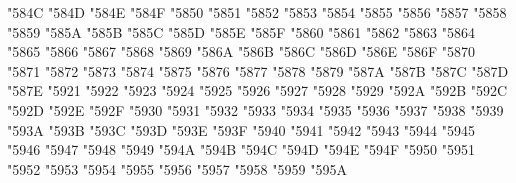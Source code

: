 {\Uchar\jis"584C %
\Uchar\jis"584D %
\Uchar\jis"584E %
\Uchar\jis"584F %
\Uchar\jis"5850 %
\Uchar\jis"5851 %
\Uchar\jis"5852 %
\Uchar\jis"5853 %
\Uchar\jis"5854 %
\Uchar\jis"5855 %
\Uchar\jis"5856 %
\Uchar\jis"5857 %
\Uchar\jis"5858 %
\Uchar\jis"5859 %
\Uchar\jis"585A %
\Uchar\jis"585B %
\Uchar\jis"585C %
\Uchar\jis"585D %
\Uchar\jis"585E %
\Uchar\jis"585F %
\Uchar\jis"5860 %
\Uchar\jis"5861 %
\Uchar\jis"5862 %
\Uchar\jis"5863 %
\Uchar\jis"5864 %
\Uchar\jis"5865 %
\Uchar\jis"5866 %
\Uchar\jis"5867 %
\Uchar\jis"5868 %
\Uchar\jis"5869 %
\Uchar\jis"586A %
\Uchar\jis"586B %
\Uchar\jis"586C %
\Uchar\jis"586D %
\Uchar\jis"586E %
\Uchar\jis"586F %
\Uchar\jis"5870 %
\Uchar\jis"5871 %
\Uchar\jis"5872 %
\Uchar\jis"5873 %
\Uchar\jis"5874 %
\Uchar\jis"5875 %
\Uchar\jis"5876 %
\Uchar\jis"5877 %
\Uchar\jis"5878 %
\Uchar\jis"5879 %
\Uchar\jis"587A %
\Uchar\jis"587B %
\Uchar\jis"587C %
\Uchar\jis"587D %
\Uchar\jis"587E %
\Uchar\jis"5921 %
\Uchar\jis"5922 %
\Uchar\jis"5923 %
\Uchar\jis"5924 %
\Uchar\jis"5925 %
\Uchar\jis"5926 %
\Uchar\jis"5927 %
\Uchar\jis"5928 %
\Uchar\jis"5929 %
\Uchar\jis"592A %
\Uchar\jis"592B %
\Uchar\jis"592C %
\Uchar\jis"592D %
\Uchar\jis"592E %
\Uchar\jis"592F %
\Uchar\jis"5930 %
\Uchar\jis"5931 %
\Uchar\jis"5932 %
\Uchar\jis"5933 %
\Uchar\jis"5934 %
\Uchar\jis"5935 %
\Uchar\jis"5936 %
\Uchar\jis"5937 %
\Uchar\jis"5938 %
\Uchar\jis"5939 %
\Uchar\jis"593A %
\Uchar\jis"593B %
\Uchar\jis"593C %
\Uchar\jis"593D %
\Uchar\jis"593E %
\Uchar\jis"593F %
\Uchar\jis"5940 %
\Uchar\jis"5941 %
\Uchar\jis"5942 %
\Uchar\jis"5943 %
\Uchar\jis"5944 %
\Uchar\jis"5945 %
\Uchar\jis"5946 %
\Uchar\jis"5947 %
\Uchar\jis"5948 %
\Uchar\jis"5949 %
\Uchar\jis"594A %
\Uchar\jis"594B %
\Uchar\jis"594C %
\Uchar\jis"594D %
\Uchar\jis"594E %
\Uchar\jis"594F %
\Uchar\jis"5950 %
\Uchar\jis"5951 %
\Uchar\jis"5952 %
\Uchar\jis"5953 %
\Uchar\jis"5954 %
\Uchar\jis"5955 %
\Uchar\jis"5956 %
\Uchar\jis"5957 %
\Uchar\jis"5958 %
\Uchar\jis"5959 %
\Uchar\jis"595A %
}
